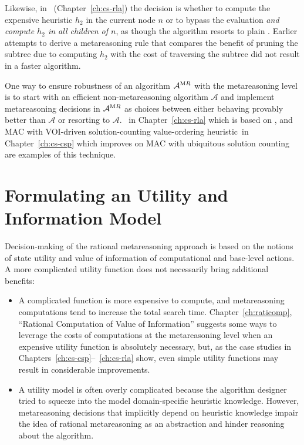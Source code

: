 Likewise, in \rationallazyastar~(Chapter~\ref{ch:cs-rla}) the
decision is whether to compute the expensive heuristic $h_2$ in the current
node $n$ or to bypass the evaluation \emph{and compute $h_2$ in all
  children of $n$}, as though the algorithm resorts to plain \lazyastar.
Earlier attempts to derive a metareasoning rule that compares the
benefit of pruning the subtree due to computing $h_2$ 
with the cost of traversing the subtree did not result in a faster
algorithm. 

One way to ensure robustness of an algorithm ${\mathcal A}^{\textrm MR}$ with the
metareasoning level is to start with an efficient non-metareasoning
algorithm ${\mathcal A}$ and implement metareasoning decisions in ${\mathcal
A}^{\textrm MR}$ as choices
between either behaving provably better than ${\mathcal A}$ or
resorting to ${\mathcal A}$.
\rationallazyastar~in Chapter~\ref{ch:cs-rla} which is based on
\lazyastar, and MAC with VOI-driven solution-counting value-ordering
heuristic~in Chapter~\ref{ch:cs-csp} which improves on MAC with
ubiquitous solution counting are examples of this technique.

\section{Formulating an Utility and Information Model}

Decision-making of the rational metareasoning approach is based on the
notions of state utility and value of information of computational and
base-level actions. A more complicated utility function does not necessarily
bring additional  benefits:
\begin{itemize}
\item A complicated function is more expensive to compute, and
  metareasoning computations tend to increase the total search
  time.  Chapter~\ref{ch:raticomp}, ``Rational Computation of Value of
  Information'' suggests some ways to leverage the costs of
  computations at the metareasoning level when an expensive utility
  function is absolutely necessary, but, as the case studies in
  Chapters~\ref{ch:cs-csp}--~\ref{ch:cs-rla} show, even simple utility
  functions may result in considerable improvements.
\item A utility model is often overly complicated because the
  algorithm designer tried to squeeze into the model domain-specific
  heuristic knowledge. However, metareasoning decisions
  that implicitly depend on heuristic knowledge impair the idea of
  rational metareasoning as an abstraction and hinder reasoning about
  the algorithm.
\end{itemize}

